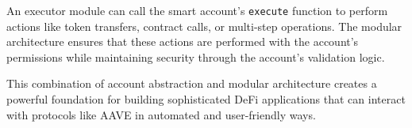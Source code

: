 An executor module can call the smart account's \texttt{execute} function to perform actions like token transfers, contract calls, or multi-step operations. The modular architecture ensures that these actions are performed with the account's permissions while maintaining security through the account's validation logic.

This combination of account abstraction and modular architecture creates a powerful foundation for building sophisticated DeFi applications that can interact with protocols like AAVE in automated and user-friendly ways.
